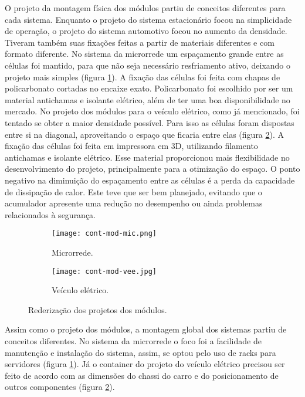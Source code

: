     O projeto da montagem física dos módulos partiu de conceitos diferentes para cada sistema. Enquanto o projeto do sistema estacionário focou na simplicidade de operação, o projeto do sistema automotivo focou no aumento da densidade. Tiveram também suas fixações feitas a partir de materiais diferentes e com formato diferente. No sistema da microrrede um espaçamento grande entre as células foi mantido, para que não seja necessário resfriamento ativo, deixando o projeto mais simples (figura \ref{fig:cont-mod-mic}). A fixação das células foi feita com chapas de policarbonato cortadas no encaixe exato. Policarbonato foi escolhido por ser um material antichamas e isolante elétrico, além de ter uma boa disponibilidade no mercado. No projeto dos módulos para o veículo elétrico, como já mencionado, foi tentado se obter a maior densidade possível. Para isso as células foram dispostas entre si na diagonal, aproveitando o espaço que ficaria entre elas (figura \ref{fig:cont-mod-vee}). A fixação das células foi feita em impressora em 3D, utilizando filamento antichamas e isolante elétrico. Esse material proporcionou mais flexibilidade no desenvolvimento do projeto, principalmente para a otimização do espaço. O ponto negativo na diminuição do espaçamento entre as células é a perda da capacidade de dissipação de calor. Este teve que ser bem planejado, evitando que o acumulador apresente uma redução no desempenho ou ainda problemas relacionados à segurança.

    \begin{figure}[!htb]
        \centering
        \begin{subfigure}{0.48\linewidth}
            \centering
            \texttt{[image: cont-mod-mic.png]}
            \caption{Microrrede.}
            \label{fig:cont-mod-mic}
        \end{subfigure}
        \begin{subfigure}{0.48\linewidth}
            \centering
            \texttt{[image: cont-mod-vee.jpg]}
            \caption{Veículo elétrico.}
            \label{fig:cont-mod-vee}
        \end{subfigure}
        \caption{Rederização dos projetos dos módulos.}
        \label{fig:cont-mods}
    \end{figure}

    Assim como o projeto dos módulos, a montagem global dos sistemas partiu de conceitos diferentes. No sistema da microrrede o foco foi a facilidade de manutenção e instalação do sistema, assim, se optou pelo uso de racks para servidores (figura \ref{fig:cont-mod-mic}). Já o container do projeto do veículo elétrico precisou ser feito de acordo com as dimensões do chassi do carro e do posicionamento de outros componentes (figura \ref{fig:cont-mod-vee}).

